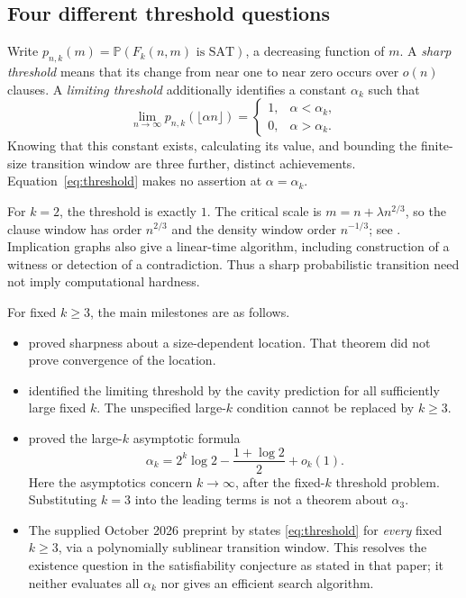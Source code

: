 \subsection{Four different threshold questions}
Write $p_{n,k}(m)=\mathbb P(F_k(n,m)\text{ is SAT})$, a decreasing function
of $m$. A \emph{sharp threshold} means that its change from near one to near
zero occurs over $o(n)$ clauses. A \emph{limiting threshold} additionally
identifies a constant $\alpha_k$ such that
\begin{equation}
 \lim_{n\to\infty}p_{n,k}(\lfloor\alpha n\rfloor)=
 \begin{cases}1,&\alpha<\alpha_k,\\0,&\alpha>\alpha_k.\end{cases}
 \label{eq:threshold}
\end{equation}
Knowing that this constant exists, calculating its value, and bounding the
finite-size transition window are three further, distinct achievements.
Equation~\eqref{eq:threshold} makes no assertion at $\alpha=\alpha_k$.

For $k=2$, the threshold is exactly $1$. The critical scale is
$m=n+\lambda n^{2/3}$, so the clause window has order $n^{2/3}$ and the
density window order $n^{-1/3}$; see
\citet[Theorem 1.1]{bbckw2001}. Implication graphs also give a linear-time
algorithm, including construction of a witness or detection of a contradiction.
Thus a sharp probabilistic transition need not imply computational hardness.

For fixed $k\ge3$, the main milestones are as follows.
\begin{itemize}
\item \citet[Theorem 1.3]{friedgut1999} proved sharpness about a
size-dependent location. That theorem did not prove convergence of the location.
\item \citet[Theorem 1]{dss2022} identified the limiting threshold by the
cavity prediction for all sufficiently large fixed $k$. The unspecified
large-$k$ condition cannot be replaced by $k\ge3$.
\item \citet[Theorem 1.1]{cop2016} proved the large-$k$ asymptotic formula
\begin{equation}
 \alpha_k=2^k\log2-\frac{1+\log2}{2}+o_k(1).
 \label{eq:largek}
\end{equation}
Here the asymptotics concern $k\to\infty$, after the fixed-$k$ threshold
problem. Substituting $k=3$ into the leading terms is not a theorem about
$\alpha_3$.
\item The supplied October 2026 preprint by
\citet[Theorem 1.1 and Corollary 1.2]{carenini2026} states
\eqref{eq:threshold} for \emph{every} fixed $k\ge3$, via a polynomially
sublinear transition window. This resolves the existence question in the
satisfiability conjecture as stated in that paper; it neither evaluates all
$\alpha_k$ nor gives an efficient search algorithm.
\end{itemize}


